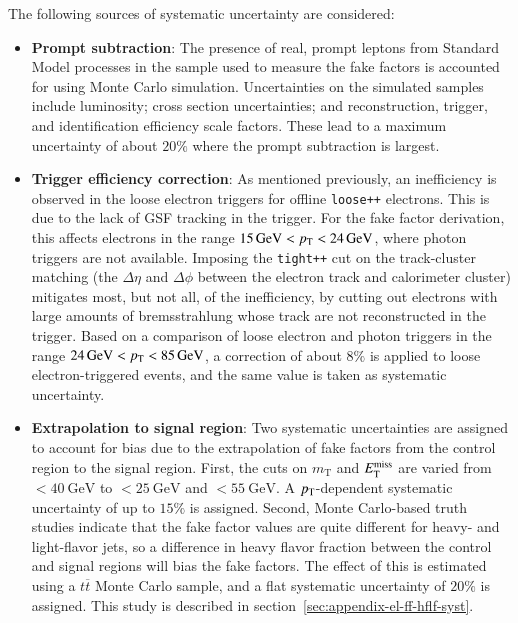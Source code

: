 The following sources of systematic uncertainty are considered:
\begin{itemize}
  \item \textbf{Prompt subtraction}: The presence of real, prompt leptons from Standard Model processes in the sample used to measure the fake factors is accounted for using Monte Carlo simulation. Uncertainties on the simulated samples include luminosity; cross section uncertainties; and reconstruction, trigger, and identification efficiency scale factors. These lead to a maximum uncertainty of about $20\%$ where the prompt subtraction is largest. 
  \item \textbf{Trigger efficiency correction}: As mentioned previously, an inefficiency is observed in the loose electron triggers for offline \texttt{loose++} electrons. This is due to the lack of GSF tracking in the trigger. For the fake factor derivation, this affects electrons in the range $\SI{15}{\giga\electronvolt}<p_{\text{T}}<\SI{24}{\giga\electronvolt}$, where photon triggers are not available. Imposing the \texttt{tight++} cut on the track-cluster matching (the $\Delta \eta$ and $\Delta \phi$ between the electron track and calorimeter cluster) mitigates most, but not all, of the inefficiency, by cutting out electrons with large amounts of bremsstrahlung whose track are not reconstructed in the trigger. Based on a comparison of loose electron and photon triggers in the range $\SI{24}{\giga\electronvolt}<p_{\text{T}}<\SI{85}{\giga\electronvolt}$, a correction of about $8\%$ is applied to loose electron-triggered events, and the same value is taken as systematic uncertainty.
  \item \textbf{Extrapolation to signal region}: Two systematic uncertainties are assigned to account for bias due to the extrapolation of fake factors from the control region to the signal region. First, the cuts on $m_{\mathrm{T}}$ and $E_{\text{T}}^{\text{miss}}$ are varied from $<\SI{40}{\giga\electronvolt}$ to $<\SI{25}{\giga\electronvolt}$ and $<\SI{55}{\giga\electronvolt}$. A $p_{\text{T}}$-dependent systematic uncertainty of up to $15\%$ is assigned. Second, Monte Carlo-based truth studies indicate that the fake factor values are quite different for heavy- and light-flavor jets, so a difference in heavy flavor fraction between the control and signal regions will bias the fake factors. The effect of this is estimated using a $t\overline{t}$ Monte Carlo sample, and a flat systematic uncertainty of $20\%$ is assigned. This study is described in section~\ref{sec:appendix-el-ff-hflf-syst}.
\end{itemize}

